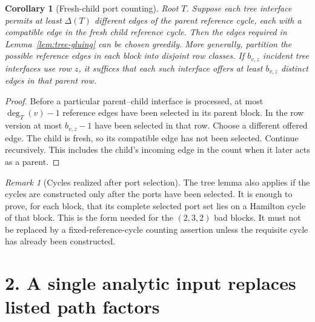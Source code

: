 \documentclass[11pt]{article}
\newtheorem{corollary}[lemma]{Corollary}
\theoremstyle{remark}\newtheorem{remark}[lemma]{Remark}
\newcommand{\DeltaT}{\Delta(T)}
\begin{document}
\begin{corollary}[Fresh-child port counting]\label{cor:port-counting}
Root $T$. Suppose each tree interface permits at least $\DeltaT$
different edges of the parent reference cycle, each with a compatible
edge in the fresh child reference cycle. Then the edges required in
Lemma~\ref{lem:tree-gluing} can be chosen greedily.
More generally, partition the possible reference edges in each block
into disjoint row classes. If $b_{v,z}$ incident tree interfaces use
row $z$, it suffices that each such interface offers at least
$b_{v,z}$ distinct edges in that parent row.
\end{corollary}
\begin{proof}
Before a particular parent--child interface is processed, at most
$\deg_T(v)-1$ reference edges have been selected in its parent block.
In the row version at most $b_{v,z}-1$ have been selected in that row.
Choose a different offered edge. The child is fresh, so its compatible
edge has not been selected. Continue recursively. This includes the
child's incoming edge in the count when it later acts as a parent.
\end{proof}

\begin{remark}[Cycles realized after port selection]
The tree lemma also applies if the cycles are constructed only after
the ports have been selected. It is enough to prove, for each block,
that its complete selected port set lies on a Hamilton cycle of that
block. This is the form needed for the $(2,3,2)$ bad blocks. It must
not be replaced by a fixed-reference-cycle counting assertion unless
the requisite cycle has already been constructed.
\end{remark}

\section*{2. A single analytic input replaces listed path factors}
\end{document}

